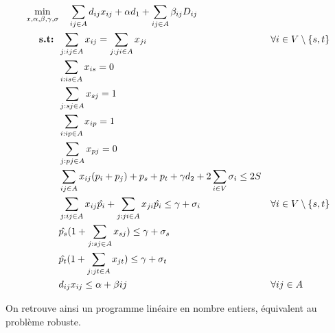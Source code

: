 \documentclass{article}
\begin{document}
\begin{align}
  \min_{x, \alpha, \beta, \gamma, \sigma} & \ \ \ \sum_{ij \in A} d_{ij} x_{ij} + \alpha d_1 + \sum_{ij \in A} \beta_{ij} D_{ij} && \notag \\
  \textbf{s.t: }  &\sum_{j: ij \in A} x_{ij} = \sum_{j: ji \in A} x_{ji} && \forall i \in V \setminus{\{s,t\}} \notag \\
  &\sum_{i: is \in A} x_{is} = 0 \notag \\
  &\sum_{j: sj \in A} x_{sj} = 1 \notag \\
  &\sum_{i: ip \in A} x_{ip} = 1 \notag \\
  &\sum_{j: pj \in A} x_{pj} = 0 \notag \\
  &\sum_{ij \in A} x_{ij} (p_i + p_j) + p_s + p_t + \gamma d_2 + 2 \sum_{i \in V} \sigma_i \leq 2S \notag \\
  & \sum_{j: ij \in A} x_{ij} \hat{p_i} + \sum_{j: ji \in A} x_{ji} \hat{p_i} \leq \gamma + \sigma_i && \forall i \in V \setminus{\{s,t\}} \\
  & \hat{p_s}(1 + \sum_{j: sj \in A} x_{sj})  \leq \gamma + \sigma_s \\
  & \hat{p_t} (1 + \sum_{j: jt \in A} x_{jt}) \leq \gamma + \sigma_t \\
  & d_{ij} x_{ij} \leq \alpha + \beta{ij} && \forall ij \in A 
\end{align}

On retrouve ainsi un programme linéaire en nombre entiers, équivalent au problème robuste.







\end{document}
